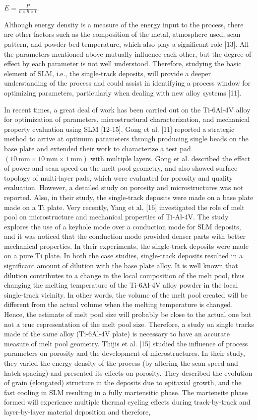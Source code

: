 \documentclass[10pt]{article}
\begin{document}
$E=\frac{P}{v \times h \times t}$.

Although energy density is a measure of the energy input to the process, there are other factors such as the composition of the metal, atmosphere used, scan pattern, and powder-bed temperature, which also play a significant role [13]. All the parameters mentioned above mutually influence each other, but the degree of effect by each parameter is not well understood. Therefore, studying the basic element of SLM, i.e., the single-track deposits, will provide a deeper understanding of the process and could assist in identifying a process window for optimizing parameters, particularly when dealing with new alloy systems [11].

In recent times, a great deal of work has been carried out on the Ti-6Al-4V alloy for optimization of parameters, microstructural characterization, and mechanical property evaluation using SLM [12-15]. Gong et al. [11] reported a strategic method to arrive at optimum parameters through producing single beads on the base plate and extended their work to characterize a test pad $(10 \mathrm{~mm} \times 10 \mathrm{~mm} \times 1 \mathrm{~mm})$ with multiple layers. Gong et al. described the effect of power and scan speed on the melt pool geometry, and also showed surface topology of multi-layer pads, which were evaluated for porosity and quality evaluation. However, a detailed study on porosity and microstructures was not reported. Also, in their study, the single-track deposits were made on a base plate made on a Ti plate. Very recently, Yang et al. [16] investigated the role of melt pool on microstructure and mechanical properties of Ti-Al-4V. The study explores the use of a keyhole mode over a conduction mode for SLM deposits, and it was noticed that the conduction mode provided denser parts with better mechanical properties. In their experiments, the single-track deposits were made on a pure Ti plate. In both the case studies, single-track deposits resulted in a significant amount of dilution with the base plate alloy. It is well known that dilution contributes to a change in the local composition of the melt pool, thus changing the melting temperature of the Ti-6Al-4V alloy powder in the local single-track vicinity. In other words, the volume of the melt pool created will be different from the actual volume when the melting temperature is changed. Hence, the estimate of melt pool size will probably be close to the actual one but not a true representation of the melt pool size. Therefore, a study on single tracks made of the same alloy (Ti-6Al-4V plate) is necessary to have an accurate measure of melt pool geometry. Thijis et al. [15] studied the influence of process parameters on porosity and the development of microstructures. In their study, they varied the energy density of the process (by altering the scan speed and hatch spacing) and presented its effects on porosity. They described the evolution of grain (elongated) structure in the deposits due to epitaxial growth, and the fast cooling in SLM resulting in a fully martensitic phase. The martensite phase formed will experience multiple thermal cycling effects during track-by-track and layer-by-layer material deposition and therefore, 
\end{document}
